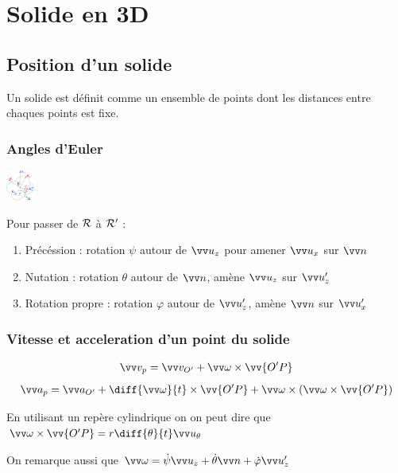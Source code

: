 \documentclass[../main.tex]{subfiles}
\begin{document}
\section{Solide en 3D}
\subsection{Position d'un solide}
Un solide est définit comme un ensemble de points dont les distances entre chaques points est fixe. 

\subsubsection{Angles d'Euler}
\begin{center}
  \includegraphics[width=0.07\textwidth]{images/euler.PNG}
\end{center}

Pour passer de \(\mathcal{R}\) à \(\mathcal{R}'\) : 
\begin{enumerate}
  \item Précéssion : rotation \(\psi\) autour de \(\uz\) pour amener \(\ux\) sur \(\nod\)
  \item Nutation : rotation \(\theta\) autour de \(\nod\), amène \(\uz\) sur \(\uz'\) 
  \item Rotation propre : rotation \(\varphi\) autour de \(\uz'\), amène \(\nod\) sur \(\ux'\) 
\end{enumerate}

\subsubsection{Vitesse et acceleration d'un point du solide}
\[\vi_p=\vi_{O'}+\vian\times\vv{O'P}\]
\[\ac_p=\ac_{O'}+\diff{\vian}{t}\times\vv{O'P}+\vian\times(\vian\times\vv{O'P})\]

En utilisant un repère cylindrique on on peut dire que \(\vian\times\vv{O'P}=r\diff{\theta}{t}\utheta\) 

On remarque aussi que \(\vian = \dot{\psi}\uz + \dot{\theta}\nod + \dot{\varphi}\uz'\)
\end{document}
